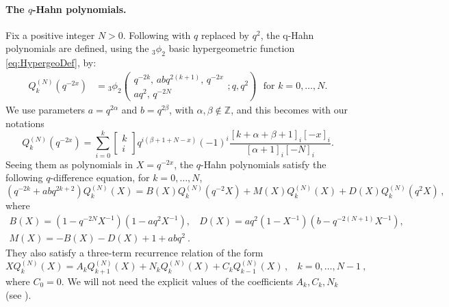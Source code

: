 \documentclass[a4paper,12pt]{article}
\numberwithin{equation}{section}
\newcommand{\qbinom}[2]{\begin{bmatrix}#1\\#2\end{bmatrix}}
\theoremstyle{rem}
\theoremstyle{definition}
\begin{document}
\paragraph{The $q$-Hahn polynomials.} Fix a positive integer $N>0$. Following \cite{KLS10} with $q$ replaced by $q^2$, the q-Hahn polynomials are defined, using the ${}_3\phi_2$ basic hypergeometric function \eqref{eq:HypergeoDef}, by:
\begin{align*}
Q^{(N)}_k(q^{-2x})&={}_3\phi_2\left(\begin{array}{c} q^{-2k},\,abq^{2(k+1)},\,q^{-2x}\\ a q^2,\,q^{-2N}\end{array};q,q^2\right)
\ \ \ \text{for $k=0,\dots,N$}.
\end{align*}
We use parameters $a=q^{2\alpha}$ and $b=q^{2\beta}$, with $\alpha,\beta\notin\mathbb{Z}$, and this becomes with our notations
\begin{equation}\label{def_Qn}
Q^{(N)}_k(q^{-2x}) =\sum_{i=0}^k \qbinom{k}{i} q^{i(\beta+1+N-x)}(-1)^i\frac{[k+\alpha+\beta+1]_i[-x]_i}{[\alpha+1]_i[-N]_i}.
\end{equation}
Seeing them as polynomials in $X=q^{-2x}$, the $q$-Hahn polynomials satisfy the following $q$-difference equation, for $k=0,\dots,N$,
\begin{equation}\label{diff_qHahn}(q^{-2k}+abq^{2k+2})Q^{(N)}_{k}(X)=B(X)Q^{(N)}_{k}(q^{-2}X)+M(X)Q^{(N)}_{k}(X)+D(X)Q^{(N)}_{k}(q^2X)\,,
\end{equation}
where 
\[\begin{array}{c}B(X)=(1-q^{-2N}X^{-1})(1-a q^{2}X^{-1}),\ \ \ \ D(X)=aq^2(1-X^{-1})(b-q^{-2(N+1)}X^{-1}),\\[0.5em]
M(X)=-B(X)-D(X)+1+abq^2\ .
\end{array}\]
They also satisfy a three-term recurrence relation of the form
\begin{equation}\label{rec_qHahn}XQ^{(N)}_{k}(X)=A_kQ^{(N)}_{k+1}(X)+N_kQ^{(N)}_{k}(X)+C_kQ^{(N)}_{k-1}(X)\,,\ \ \ \ k=0,\dots,N-1\ ,
\end{equation}
where $C_0=0$. We will not need the explicit values of the coefficients $A_k,C_k,N_k$ (see \cite{KLS10}).
\end{document}
